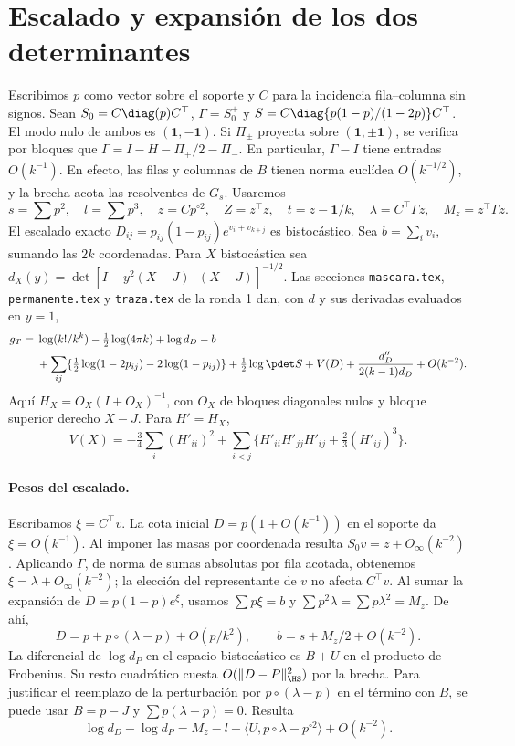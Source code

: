 \section{Escalado y expansión de los dos determinantes}
Escribimos $p$ como vector sobre el soporte y $C$ para la incidencia fila--columna sin signos.
Sean $S_0=C\diag(p)C^\top$, $\Gamma=S_0^+$ y
$S=C\diag\{p(1-p)/(1-2p)\}C^\top$. El modo nulo de ambos es $(\mathbf1,-\mathbf1)$.
Si $\Pi_\pm$ proyecta sobre $(\mathbf1,\pm\mathbf1)$, se verifica por bloques que
$\Gamma=I-H-\Pi_+/2-\Pi_-$. En particular, $\Gamma-I$ tiene entradas $O(k^{-1})$.
En efecto, las filas y columnas de $B$ tienen norma euclídea $O(k^{-1/2})$,
y la brecha acota las resolventes de $G_s$.
Usaremos
\[
 s=\sum p^2,\quad l=\sum p^3,\quad z=Cp^{\circ2},\quad Z=z^\top z,\quad
 t=z-\mathbf1/k,\quad \lambda=C^\top\Gamma z,\quad M_z=z^\top\Gamma z .
\]
El escalado exacto $D_{ij}=p_{ij}(1-p_{ij})e^{v_i+v_{k+j}}$ es bistocástico.
Sea $b=\sum_i v_i$, sumando las $2k$ coordenadas. Para $X$ bistocástica sea
$d_X(y)=\det[I-y^2(X-J)^\top(X-J)]^{-1/2}$.
Las secciones \texttt{mascara.tex}, \texttt{permanente.tex} y \texttt{traza.tex} de la ronda 1 dan,
con $d$ y sus derivadas evaluados en $y=1$,
\begin{align*}
 g_T={}&\log(k!/k^k)-\tfrac12\log(4\pi k)+\log d_D-b\\
 &+\sum_{ij}\{\tfrac12\log(1-2p_{ij})-2\log(1-p_{ij})\}
 +\tfrac12\log\pdet S+V(D)+\frac{d_D''}{2(k-1)d_D}+O(k^{-2}).
\end{align*}
Aquí $H_X=O_X(I+O_X)^{-1}$, con $O_X$ de bloques diagonales nulos y
bloque superior derecho $X-J$. Para $H'=H_X$,
\[
 V(X)=-\tfrac34\sum_i(H'_{ii})^2+
 \sum_{i<j}\{H'_{ii}H'_{jj}H'_{ij}+\tfrac23(H'_{ij})^3\}.
\]
\paragraph{Pesos del escalado.}
Escribamos $\xi=C^\top v$. La cota inicial $D=p(1+O(k^{-1}))$ en el soporte da
$\xi=O(k^{-1})$. Al imponer las masas por coordenada resulta
$S_0v=z+O_\infty(k^{-2})$.
Aplicando $\Gamma$, de norma de sumas absolutas por fila acotada, obtenemos
$\xi=\lambda+O_\infty(k^{-2})$; la elección del representante de $v$ no afecta $C^\top v$.
Al sumar la expansión de $D=p(1-p)e^\xi$, usamos
$\sum p\xi=b$ y $\sum p^2\lambda=\sum p\lambda^2=M_z$. De ahí,
\[
 D=p+p\circ(\lambda-p)+O(p/k^2),\qquad b=s+M_z/2+O(k^{-2}).
\]
La diferencial de $\log d_P$ en el espacio bistocástico es $B+U$ en el producto de Frobenius.
Su resto cuadrático cuesta $O(\|D-P\|_{\HS}^2)$ por la brecha.
Para justificar el reemplazo de la perturbación por $p\circ(\lambda-p)$ en el término con $B$,
se puede usar $B=p-J$ y $\sum p(\lambda-p)=0$.
Resulta
\[
 \log d_D-\log d_P=M_z-l+\langle U,p\circ\lambda-p^{\circ2}\rangle+O(k^{-2}).
\]
